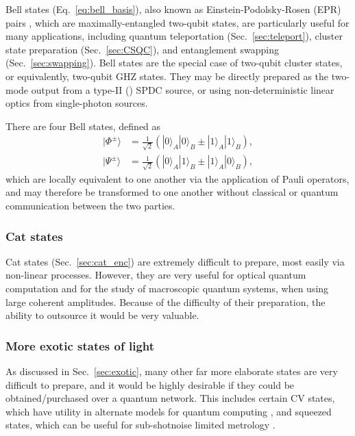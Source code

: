 \documentclass[aps,rmp,twocolumn,amsmath,amssymb,nofootinbib,superscriptaddress,longbibliography,floatfix]{revtex4-1}
\newcommand{\ket}[1]{|#1\rangle}
\newcommand{\comment}[1]{{\color{blue}{\textbf{#1}}}}
\begin{document}
Bell states (Eq.~\ref{eq:bell_basis}), also known as Einstein-Podolsky-Rosen (EPR) pairs \cite{bib:EPR35}, which are maximally-entangled two-qubit states, are particularly useful for many applications, including quantum teleportation (Sec.~\ref{sec:teleport}), cluster state preparation (Sec.~\ref{sec:CSQC}), and entanglement swapping (Sec.~\ref{sec:swapping}). Bell states are the special case of two-qubit cluster states, or equivalently, two-qubit GHZ states. They may be directly prepared as the two-mode output from a type-II (\comment{Type-I or type-II???}) SPDC source, or using non-deterministic linear optics from single-photon sources.

There are four Bell states, defined as 
\begin{align} \label{eq:bell_basis}
\ket{\Phi^{\pm}} &= \frac{1}{\sqrt{2}} (\ket{0}_A\ket{0}_B \pm \ket{1}_A\ket{1}_B), \nonumber \\
\ket{\Psi^{\pm}} &= \frac{1}{\sqrt{2}} (\ket{0}_A\ket{1}_B \pm \ket{1}_A\ket{0}_B),
\end{align}
which are locally equivalent to one another via the application of Pauli operators, and may therefore be transformed to one another without classical or quantum communication between the two parties.

%
%

\subsubsection{Cat states}

Cat states (Sec.~\ref{sec:cat_enc}) are extremely difficult to prepare, most easily via non-linear processes. However, they are very useful for optical quantum computation and for the study of macroscopic quantum systems, when using large coherent amplitudes. Because of the difficulty of their preparation, the ability to outsource it would be very valuable.

%
%

\subsubsection{More exotic states of light}

As discussed in Sec.~\ref{sec:exotic}, many other far more elaborate states are very difficult to prepare, and it would be highly desirable if they could be obtained/purchased over a quantum network. This includes certain CV states, which have utility in alternate models for quantum computing \cite{bib:Menicucci06, Ralph, Lund}, and squeezed states, which can be useful for sub-shotnoise limited metrology \cite{???}.
\end{document}

